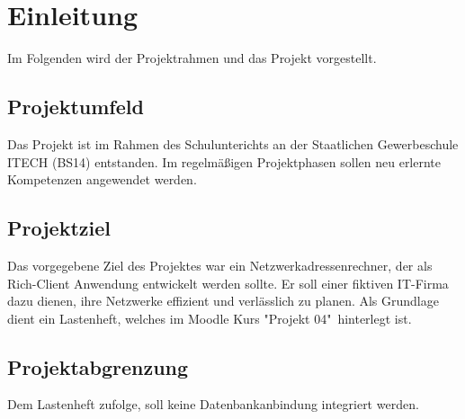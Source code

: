 \section{Einleitung}
Im Folgenden wird der Projektrahmen und das Projekt vorgestellt.

\subsection{Projektumfeld}
Das Projekt ist im Rahmen des Schulunterichts an der Staatlichen Gewerbeschule ITECH (BS14)
entstanden. Im regelmäßigen Projektphasen sollen neu erlernte Kompetenzen angewendet werden.

\subsection{Projektziel}
Das vorgegebene Ziel des Projektes war ein Netzwerkadressenrechner, der als Rich-Client Anwendung
entwickelt werden sollte. Er soll einer fiktiven IT-Firma dazu dienen, ihre Netzwerke effizient
und verlässlich zu planen.
Als Grundlage dient ein Lastenheft, welches im Moodle Kurs "Projekt 04"\ hinterlegt ist.

\subsection{Projektabgrenzung}
Dem Lastenheft zufolge, soll keine Datenbankanbindung integriert werden.